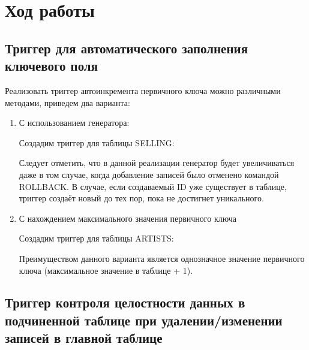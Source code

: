\section{Ход работы}

\subsection{Триггер для автоматического заполнения ключевого поля}

Реализовать триггер автоинкремента первичного ключа можно различными методами, приведем два варианта:

\begin{enumerate}
	\item С использованием генератора:

	

	Создадим триггер для таблицы SELLING:

	

	Следует отметить, что в данной реализации генератор будет увеличиваться даже в том случае, когда добавление записей было отменено командой ROLLBACK. В случае, если создаваемый ID уже существует в таблице, триггер создаёт новый до тех пор, пока не достигнет уникального. \\
	
	\item С нахождением максимального значения первичного ключа

	Создадим триггер для таблицы ARTISTS:

	

	Преимуществом данного варианта является однозначное значение первичного ключа (максимальное значение в таблице + 1).
\end{enumerate}


\subsection{Триггер контроля целостности данных в подчиненной таблице при удалении/изменении записей в главной таблице}

